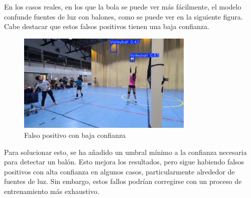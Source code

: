 \documentclass[12pt]{report} %
\begin{document}
    En los casos reales, en los que la bola se puede ver más fácilmente, el
    modelo confunde fuentes de luz con balones, como se
    puede ver en la siguiente figura. Cabe destacar que estos falsos positivos
    tienen una baja confianza.

    \begin{figure}[H]
    \includegraphics[width=0.75\textwidth]{bola1.png}
    \caption{Falso positivo con baja confianza}
    \end{figure}

    Para solucionar esto, se ha añadido un umbral mínimo a la confianza
    necesaria para detectar un balón. Esto mejora los resultados, pero sigue
    habiendo falsos positivos con alta confianza en algunos casos,
    particularmente alrededor de fuentes de luz. Sin embargo, estos fallos
    podrían corregirse con un proceso de entrenamiento más exhaustivo.
\end{document}

